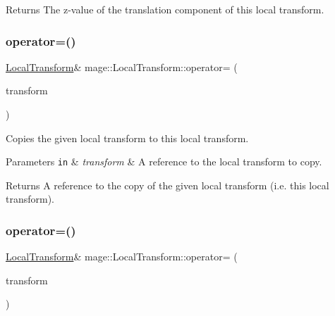 \begin{DoxyReturn}{Returns}
The z-\/value of the translation component of this local transform. 
\end{DoxyReturn}
\mbox{\label{classmage_1_1_local_transform_a518f40cfd7973289b692057d30765741}} 
\subsubsection{\texorpdfstring{operator=()}{operator=()}\hspace{0.1cm}{\footnotesize\ttfamily [1/2]}}
{\footnotesize\ttfamily \mbox{\hyperlink{classmage_1_1_local_transform}{Local\+Transform}}\& mage\+::\+Local\+Transform\+::operator= (\begin{DoxyParamCaption}\item[{const \mbox{\hyperlink{classmage_1_1_local_transform}{Local\+Transform}} \&}]{transform }\end{DoxyParamCaption})\hspace{0.3cm}{\ttfamily [default]}}

Copies the given local transform to this local transform.


\begin{DoxyParams}[1]{Parameters}
\mbox{\tt in}  & {\em transform} & A reference to the local transform to copy. \\
\hline
\end{DoxyParams}
\begin{DoxyReturn}{Returns}
A reference to the copy of the given local transform (i.\+e. this local transform). 
\end{DoxyReturn}
\mbox{\label{classmage_1_1_local_transform_ae0e82157979f8ebfe4a207d53d0fbfbf}} 
\subsubsection{\texorpdfstring{operator=()}{operator=()}\hspace{0.1cm}{\footnotesize\ttfamily [2/2]}}
{\footnotesize\ttfamily \mbox{\hyperlink{classmage_1_1_local_transform}{Local\+Transform}}\& mage\+::\+Local\+Transform\+::operator= (\begin{DoxyParamCaption}\item[{\mbox{\hyperlink{classmage_1_1_local_transform}{Local\+Transform}} \&\&}]{transform }\end{DoxyParamCaption})\hspace{0.3cm}{\ttfamily [default]}}

